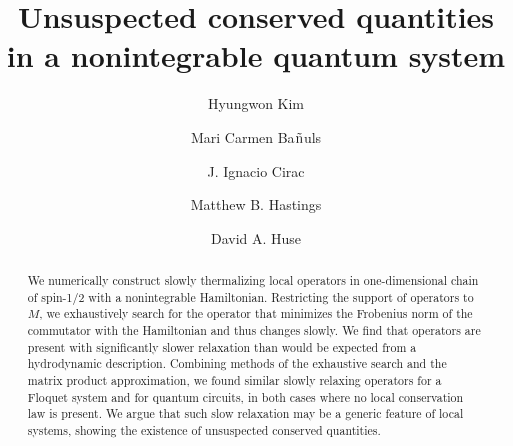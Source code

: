 \documentclass[twocolumn,superscriptaddress, prb]{revtex4-1}
\begin{document}
\title{Unsuspected conserved quantities in a nonintegrable quantum system}

\author{Hyungwon Kim}

\author{Mari Carmen Ba${\rm{\tilde n}}$uls}

\author{J. Ignacio Cirac}

\author{Matthew B. Hastings}

\author{David A. Huse}

\begin{abstract}
We numerically construct slowly thermalizing local operators in one-dimensional chain of spin-1/2 with a nonintegrable Hamiltonian.
Restricting the support of operators to $M$, we exhaustively search for the operator that minimizes the Frobenius norm of the commutator
with the Hamiltonian and thus changes slowly.  We find that operators are present with significantly slower relaxation than would be
expected from a hydrodynamic description. Combining methods of the exhaustive search and the matrix product approximation, we found
similar slowly relaxing operators for a Floquet system and for quantum circuits, in both cases where no local conservation law is present.
We argue that such slow relaxation may be a generic feature of local systems, showing the existence of unsuspected conserved quantities.
\end{abstract}

\pacs{}

\maketitle
\end{document}
